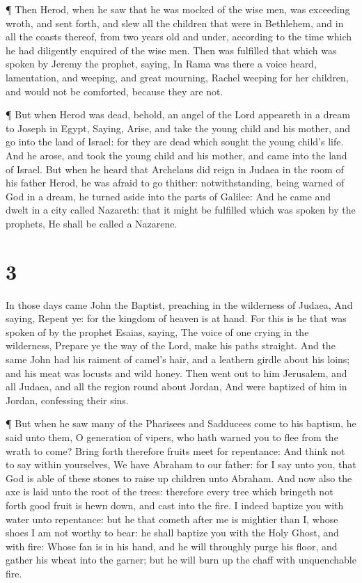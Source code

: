 ¶ Then Herod, when he saw that he was mocked of the wise
men, was exceeding wroth, and sent forth, and slew all the children that
were in Bethlehem, and in all the coasts thereof, from two years old and
under, according to the time which he had diligently enquired of the
wise men.  Then was fulfilled that which was spoken by
Jeremy the prophet, saying,  In Rama was there a voice
heard, lamentation, and weeping, and great mourning, Rachel weeping for
her children, and would not be comforted, because they are not.

 ¶ But when Herod was dead, behold, an angel of the Lord
appeareth in a dream to Joseph in Egypt,  Saying, Arise,
and take the young child and his mother, and go into the land of Israel:
for they are dead which sought the young child's life.  And
he arose, and took the young child and his mother, and came into the
land of Israel.  But when he heard that Archelaus did reign
in Judaea in the room of his father Herod, he was afraid to go thither:
notwithstanding, being warned of God in a dream, he turned aside into
the parts of Galilee:  And he came and dwelt in a city
called Nazareth: that it might be fulfilled which was spoken by the
prophets, He shall be called a Nazarene.

\hypertarget{section-2}{%
\section{3}\label{section-2}}

 In those days came John the Baptist, preaching in the
wilderness of Judaea,  And saying, Repent ye: for the
kingdom of heaven is at hand.  For this is he that was
spoken of by the prophet Esaias, saying, The voice of one crying in the
wilderness, Prepare ye the way of the Lord, make his paths straight.
 And the same John had his raiment of camel's hair, and a
leathern girdle about his loins; and his meat was locusts and wild
honey.  Then went out to him Jerusalem, and all Judaea, and
all the region round about Jordan,  And were baptized of him
in Jordan, confessing their sins.

 ¶ But when he saw many of the Pharisees and Sadducees come
to his baptism, he said unto them, O generation of vipers, who hath
warned you to flee from the wrath to come?  Bring forth
therefore fruits meet for repentance:  And think not to say
within yourselves, We have Abraham to our father: for I say unto you,
that God is able of these stones to raise up children unto Abraham.
 And now also the axe is laid unto the root of the trees:
therefore every tree which bringeth not forth good fruit is hewn down,
and cast into the fire.  I indeed baptize you with water
unto repentance: but he that cometh after me is mightier than I, whose
shoes I am not worthy to bear: he shall baptize you with the Holy Ghost,
and with fire:  Whose fan is in his hand, and he will
throughly purge his floor, and gather his wheat into the garner; but he
will burn up the chaff with unquenchable fire.


